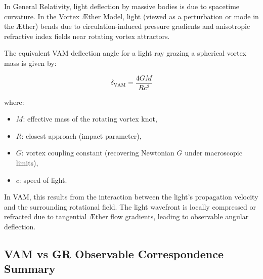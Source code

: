 In General Relativity, light deflection by massive bodies is due to spacetime curvature. In the Vortex Æther Model, light (viewed as a perturbation or mode in the Æther) bends due to circulation-induced pressure gradients and anisotropic refractive index fields near rotating vortex attractors.

The equivalent VAM deflection angle for a light ray grazing a spherical vortex mass is given by:

\begin{equation}
    \delta_{\text{VAM}} =
    \frac{4 G M}{R c^2}
\end{equation}

where:
\begin{itemize}
    \item \( M \): effective mass of the rotating vortex knot,
    \item \( R \): closest approach (impact parameter),
    \item \( G \): vortex coupling constant (recovering Newtonian \( G \) under macroscopic limits),
    \item \( c \): speed of light.
\end{itemize}

In VAM, this results from the interaction between the light's propagation velocity and the surrounding rotational field. The light wavefront is locally compressed or refracted due to tangential Æther flow gradients, leading to observable angular deflection.
\subsection*{VAM vs GR Observable Correspondence Summary}

\usepackage{multirow}
\renewcommand{\arraystretch}{1.5}

